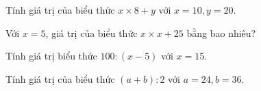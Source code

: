 \begin{ex}
Tính giá trị của biểu thức $x \times 8 + y$ với $x = 10, y = 20$.
\end{ex}

\begin{ex}
Với $x = 5$, giá trị của biểu thức $x \times x + 25$ bằng bao nhiêu?
\end{ex}

\begin{ex}
Tính giá trị biểu thức $100 : (x - 5)$ với $x = 15$.
\end{ex}

\begin{ex}
Tính giá trị của biểu thức $(a + b) : 2$ với $a = 24, b = 36$.
\end{ex}
